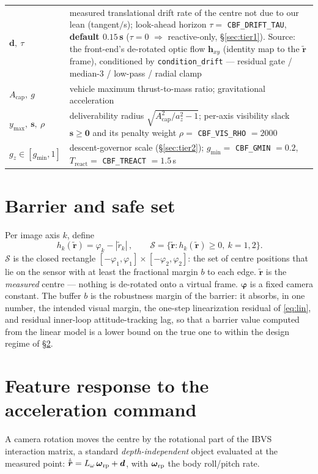 \documentclass[11pt]{article}
\begin{document}
\begin{tabular}{@{}l >{\raggedright\arraybackslash}p{}@{}}
$\boldsymbol{d},\ \tau$ & measured translational drift rate of the centre not due to our lean (tangent$/$s); look-ahead horizon $\tau=$ \texttt{CBF\_DRIFT\_TAU}, \textbf{default $0.15$\,s} ($\tau=0$ $\Rightarrow$ reactive-only, \S\ref{sec:tier1}). Source: the front-end's de-rotated optic flow $\boldsymbol{h}_{xy}$ (identity map to the $\tilde{\boldsymbol r}$ frame), conditioned by \texttt{condition\_drift} --- residual gate / median-3 / low-pass / radial clamp \\
$A_\text{cap},\ g$ & vehicle maximum thrust-to-mass ratio; gravitational acceleration \\
$y_\text{max},\ \boldsymbol{s},\ \rho$ & deliverability radius $\sqrt{A_\text{cap}^2/a_z^2-1}$; per-axis visibility slack $\boldsymbol{s}\ge\boldsymbol{0}$ and its penalty weight $\rho=$ \texttt{CBF\_VIS\_RHO} $=2000$ \\
$g_z\in[g_\text{min},1]$ & descent-governor scale (\S\ref{sec:tier2}); $g_\text{min}=$ \texttt{CBF\_GMIN} $=0.2$, $T_\text{react}=$ \texttt{CBF\_TREACT} $=1.5$\,s \\
\bottomrule
\end{tabular}

\section{Barrier and safe set}\label{sec:barrier}
Per image axis $k$, define
\begin{equation}\label{eq:barrier}
\boxed{\,h_k(\tilde{\boldsymbol{r}})=\varphi_k-|\tilde r_k|\,},
\qquad
\mathcal{S}=\{\tilde{\boldsymbol{r}}: h_k(\tilde{\boldsymbol{r}})\ge0,\ k=1,2\}.
\end{equation}
$\mathcal{S}$ is the closed rectangle $[-\varphi_1,\varphi_1]\times[-\varphi_2,\varphi_2]$: the set of centre
positions that lie on the sensor with at least the fractional margin $b$ to each edge. $\tilde{\boldsymbol
r}$ is the \emph{measured} centre --- nothing is de-rotated onto a virtual frame. $\boldsymbol\varphi$ is
a fixed camera constant. The buffer $b$ is the robustness margin of the barrier: it absorbs, in one
number, the intended visual margin, the one-step linearization residual of \eqref{eq:lin}, and residual
inner-loop attitude-tracking lag, so that a barrier value computed from the linear model is a lower bound
on the true one to within the design regime of \S\ref{sec:lin}.

\section{Feature response to the acceleration command}\label{sec:lin}
A camera rotation moves the centre by the rotational part of the IBVS interaction matrix, a standard
\emph{depth-independent} object evaluated at the measured point:
$\dot{\tilde{\boldsymbol{r}}}=L_\omega\,\boldsymbol\omega_{\rm rp}+\boldsymbol{d}$, with
$\boldsymbol\omega_{\rm rp}$ the body roll/pitch rate.
\end{document}

